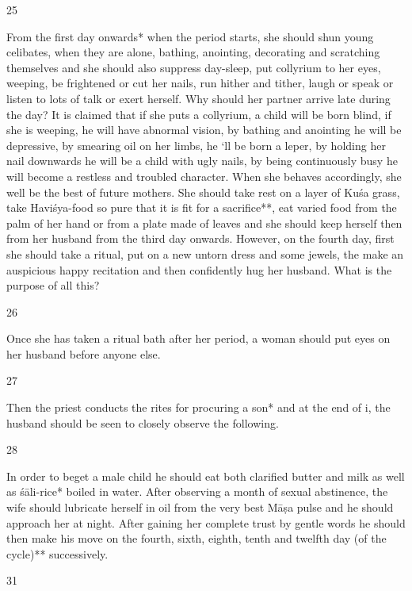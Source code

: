 \begin{translation}
\begin{tt}
\item[25]

From the first day onwards* when the period starts, she  should shun 
  young celibates, when they are alone, bathing, anointing, decorating and 
  scratching themselves and she should also suppress day-sleep, put collyrium to 
  her eyes, weeping, be frightened or cut her nails, run hither and tither, laugh or 
  speak or listen to lots of talk or exert herself. Why should her partner arrive 
  late during the day? It is claimed that if she puts a collyrium, a child will be born 
  blind, if she is weeping, he will have abnormal vision, by bathing and anointing 
  he will be depressive, by smearing oil on her limbs, he ‘ll be born a leper, by 
  holding her nail downwards he will be a child with ugly nails, by being 
  continuously busy he will become a restless and troubled character. When she 
  behaves accordingly, she well be the best of future mothers. She should take 
  rest on a layer of Kuśa  grass,  take Haviśya-food so pure that it is fit for a 
  sacrifice**, eat varied food from the palm of her hand or from a plate made of 
  leaves and she should keep herself then from her husband from the third day 
  onwards. However, on the fourth day, first she should take a ritual, put on a 
  new untorn dress and some jewels, the make an auspicious happy recitation 
  and then confidently hug her husband. What is the purpose of all this?
  
\item[26]

Once she has taken a ritual bath after her period, a woman should put 
  eyes on her husband before anyone else.
  
\item[27]

Then the priest conducts the rites for procuring a son* and at the end of 
  i, the husband should be seen to closely observe the following.
  
\item[28]

 In order to beget a male child he should eat both clarified butter and 
  milk as well as śāli-rice* boiled in water. After observing a month of sexual 
  abstinence, the wife should lubricate herself in oil from the very best Māṣa 
  pulse and he should approach her at night. After gaining her complete trust by 
  gentle words he should then make his move on the fourth, sixth, eighth, tenth 
  and twelfth day (of the cycle)** successively.
  
\item[31]


\end{tt}
\end{translation}
